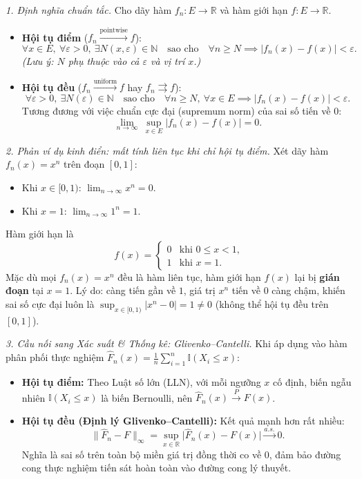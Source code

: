 
\textit{1. Định nghĩa chuẩn tắc.} Cho dãy hàm $f_n:E\to\mathbb{R}$ và hàm giới hạn $f:E\to\mathbb{R}$.
\begin{itemize}
\item \textbf{Hội tụ điểm} ($f_n\xrightarrow{\text{pointwise}}f$):
\[ \forall x\in E,\ \forall \varepsilon>0,\ \exists N(x,\varepsilon)\in\mathbb{N}\quad\text{sao cho}\quad \forall n\ge N \implies |f_n(x)-f(x)|<\varepsilon. \]
\emph{(Lưu ý: $N$ phụ thuộc vào cả $\varepsilon$ và vị trí $x$.)}
\item \textbf{Hội tụ đều} ($f_n\xrightarrow{\text{uniform}}f$ hay $f_n\rightrightarrows f$):
\[ \forall \varepsilon>0,\ \exists N(\varepsilon)\in\mathbb{N}\quad\text{sao cho}\quad \forall n\ge N,\ \forall x\in E \implies |f_n(x)-f(x)|<\varepsilon. \]
Tương đương với việc chuẩn cực đại (supremum norm) của sai số tiến về $0$:
\[ \lim_{n\to\infty}\ \sup_{x\in E}|f_n(x)-f(x)| = 0. \]
\end{itemize}

\textit{2. Phản ví dụ kinh điển: mất tính liên tục khi chỉ hội tụ điểm.} Xét dãy hàm $f_n(x)=x^{n}$ trên đoạn $[0,1]$:
\begin{itemize}
\item Khi $x\in[0,1)$: $\lim_{n\to\infty}x^{n}=0$.
\item Khi $x=1$: $\lim_{n\to\infty}1^{n}=1$.
\end{itemize}
Hàm giới hạn là
\[
f(x)=\begin{cases} 0 & \text{khi } 0\le x<1,\\ 1 & \text{khi } x=1.\end{cases}
\]
Mặc dù mọi $f_n(x)=x^{n}$ đều là hàm liên tục, hàm giới hạn $f(x)$ lại bị \textbf{gián đoạn} tại $x=1$. Lý do: càng tiến gần về $1$, giá trị $x^{n}$ tiến về $0$ càng chậm, khiến sai số cực đại luôn là $\sup_{x\in[0,1)}|x^{n}-0|=1\neq 0$ (không thể hội tụ đều trên $[0,1]$).

\textit{3. Cầu nối sang Xác suất \& Thống kê: Glivenko--Cantelli.} Khi áp dụng vào hàm phân phối thực nghiệm $\widehat F_n(x)=\frac1n\sum_{i=1}^n\mathbb{I}(X_i\le x)$:
\begin{itemize}
\item \textbf{Hội tụ điểm:} Theo Luật số lớn (LLN), với mỗi ngưỡng $x$ cố định, biến ngẫu nhiên $\mathbb{I}(X_i\le x)$ là biến Bernoulli, nên $\widehat F_n(x)\xrightarrow{P}F(x)$.
\item \textbf{Hội tụ đều (Định lý Glivenko--Cantelli):} Kết quả mạnh hơn rất nhiều:
\[ \big\|\widehat F_n-F\big\|_\infty=\sup_{x\in\mathbb{R}}\big|\widehat F_n(x)-F(x)\big|\xrightarrow{a.s.}0. \]
Nghĩa là sai số trên toàn bộ miền giá trị đồng thời co về $0$, đảm bảo đường cong thực nghiệm tiến sát hoàn toàn vào đường cong lý thuyết.
\end{itemize}

